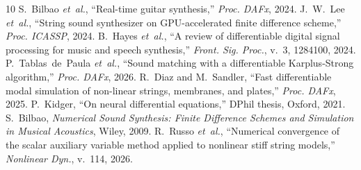 \documentclass[a4paper]{article}
\begin{document}
\begin{sloppy}
{\footnotesize
\begin{thebibliography}{10}
 S.~Bilbao \emph{et~al.}, ``Real-time guitar synthesis,'' \emph{Proc. DAFx}, 2024.
 J.~W.~Lee \emph{et~al.}, ``String sound synthesizer on GPU-accelerated finite difference scheme,'' \emph{Proc. ICASSP}, 2024.
 B.~Hayes \emph{et~al.}, ``A review of differentiable digital signal processing for music and speech synthesis,'' \emph{Front. Sig. Proc.}, v.~3, 1284100, 2024.
 P.~Tablas~de~Paula \emph{et~al.}, ``Sound matching with a differentiable Karplus-Strong algorithm,'' \emph{Proc. DAFx}, 2026.
 R.~Diaz and M.~Sandler, ``Fast differentiable modal simulation of non-linear strings, membranes, and plates,'' \emph{Proc. DAFx}, 2025.
 P.~Kidger, ``On neural differential equations,'' DPhil thesis, Oxford, 2021.
 S.~Bilbao, \emph{Numerical Sound Synthesis: Finite Difference Schemes and Simulation in Musical Acoustics}, Wiley, 2009.
 R.~Russo \emph{et~al.}, ``Numerical convergence of the scalar auxiliary variable method applied to nonlinear stiff string models,'' \emph{Nonlinear Dyn.}, v.~114, 2026.
\end{thebibliography}}
\end{sloppy}
\end{document}
